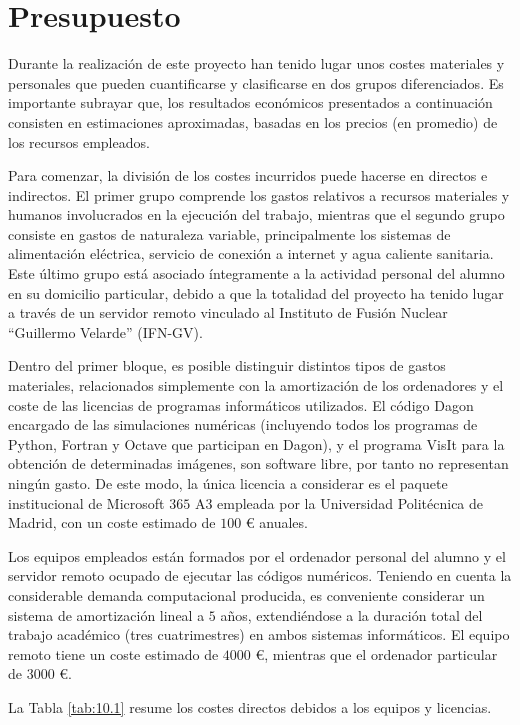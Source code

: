\chapter{Presupuesto}\label{cap:10}
Durante la realización de este proyecto han tenido lugar unos costes materiales y personales que pueden cuantificarse y clasificarse en dos grupos diferenciados. Es importante subrayar que, los resultados económicos presentados a continuación consisten en estimaciones aproximadas, basadas en los precios (en promedio) de los recursos empleados. 

Para comenzar, la división de los costes incurridos puede hacerse en directos e indirectos. El primer grupo comprende los gastos relativos a recursos materiales y humanos involucrados en la ejecución del trabajo, mientras que el segundo grupo consiste en gastos de naturaleza variable, principalmente los sistemas de alimentación eléctrica, servicio de conexión a internet y agua caliente sanitaria. Este último grupo está asociado íntegramente a la actividad personal del alumno en su domicilio particular, debido a que la totalidad del proyecto ha tenido lugar a través de un servidor remoto vinculado al Instituto de Fusión Nuclear \enquote{Guillermo Velarde} (IFN-GV). 

Dentro del primer bloque, es posible distinguir distintos tipos de gastos materiales, relacionados simplemente con la amortización de los ordenadores y el coste de las licencias de programas informáticos utilizados. El código Dagon encargado de las simulaciones numéricas (incluyendo todos los programas de Python, Fortran y Octave que participan en Dagon), y el programa VisIt para la obtención de determinadas imágenes, son software libre, por tanto no representan ningún gasto. De este modo, la única licencia a considerar es el paquete institucional de Microsoft $365$ A3 empleada por la Universidad Politécnica de Madrid, con un coste estimado de $100$ € anuales.

Los equipos empleados están formados por el ordenador personal del alumno y el servidor remoto ocupado de ejecutar las códigos numéricos. Teniendo en cuenta la considerable demanda computacional producida, es conveniente considerar un sistema de amortización lineal a $5$ años, extendiéndose a la duración total del trabajo académico (tres cuatrimestres) en ambos sistemas informáticos. El equipo remoto tiene un coste estimado de $4000$ €, mientras que el ordenador particular de $3000$ €. 

La Tabla \ref{tab:10.1} resume los costes directos debidos a los equipos y licencias.

